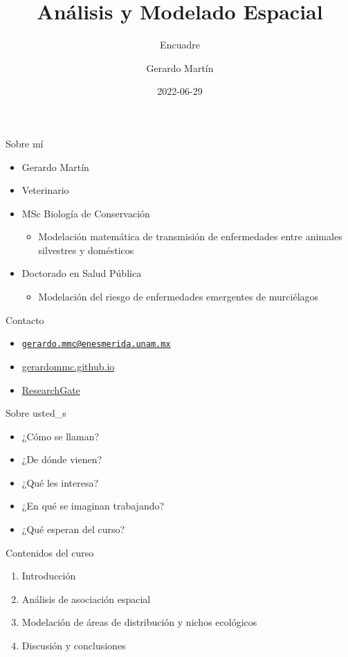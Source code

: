 \documentclass[
  11pt,
  ignorenonframetext,
]{beamer}
\title{Análisis y Modelado Espacial}
\subtitle{Encuadre}
\author{Gerardo Martín}
\date{2022-06-29}
\providecommand{\tightlist}{%
  \setlength{\itemsep}{0pt}\setlength{\parskip}{0pt}}
\begin{document}
\frame{\titlepage}

\begin{frame}{Sobre mí}
\protect\hypertarget{sobre-muxed}{}
\begin{itemize}
\item
  Gerardo Martín
\item
  Veterinario
\item
  MSc Biología de Conservación

  \begin{itemize}
  \tightlist
  \item
    Modelación matemática de transmisión de enfermedades entre animales
    silvestres y domésticos
  \end{itemize}
\item
  Doctorado en Salud Pública

  \begin{itemize}
  \tightlist
  \item
    Modelación del riesgo de enfermedades emergentes de murciélagos
  \end{itemize}
\end{itemize}
\end{frame}

\begin{frame}{Contacto}
\protect\hypertarget{contacto}{}
\begin{itemize}
\tightlist
\item
  \href{mailto:gerardo.mmc@enesmerida.unam.mx}{\nolinkurl{gerardo.mmc@enesmerida.unam.mx}}
\item
  \href{https://gerardommc.github.io}{gerardommc.github.io}
\item
  \href{https://www.researchgate.net/profile/Gerardo-Martin}{ResearchGate}
\end{itemize}
\end{frame}

\begin{frame}{Sobre usted\_s}
\protect\hypertarget{sobre-usted_s}{}
\begin{itemize}
\tightlist
\item
  ¿Cómo se llaman?
\item
  ¿De dónde vienen?
\item
  ¿Qué les interesa?
\item
  ¿En qué se imaginan trabajando?
\item
  ¿Qué esperan del curso?
\end{itemize}
\end{frame}

\begin{frame}{Contenidos del curso}
\protect\hypertarget{contenidos-del-curso}{}
\begin{enumerate}
\tightlist
\item
  Introducción
\item
  Análisis de asociación espacial
\item
  Modelación de áreas de distribución y nichos ecológicos
\item
  Discusión y conclusiones
\end{enumerate}
\end{frame}
\end{document}
